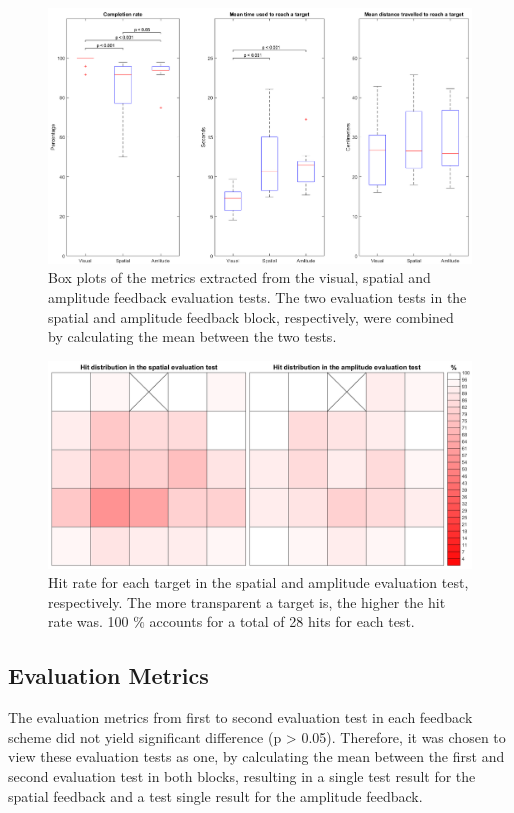 \begin{figure}[t]                 
	\includegraphics[width=.85\textwidth]{figures/boxplot_results}
	\caption{Box plots of the metrics extracted from the visual, spatial and amplitude feedback evaluation tests. The two evaluation tests in the spatial and amplitude feedback block, respectively, were combined by calculating the mean between the two tests.}
	\label{fig:pa:boxplot_results} 
\end{figure}

\begin{figure}[t]                 
	\includegraphics[width=.85\textwidth]{figures/hit_dist}
	\caption{Hit rate for each target in the spatial and amplitude evaluation test, respectively. The more transparent a target is, the higher the hit rate was. 100 $\%$ accounts for a total of 28 hits for each test.}
	\label{fig:pa:hit_dist} 
\end{figure}


\subsection{Evaluation Metrics}
The evaluation metrics from first to second evaluation test in each feedback scheme did not yield significant difference (p > 0.05). Therefore, it was chosen to view these evaluation tests as one, by calculating the mean between the first and second evaluation test in both blocks, resulting in a single test result for the spatial feedback and a test single result for the amplitude feedback. 

